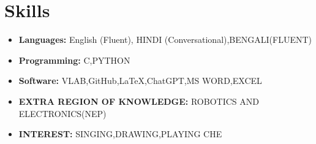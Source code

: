 \documentclass[a4paper,10pt]{article}
\begin{document}
\vspace{1cm}

\section*{Skills}
\begin{itemize}
    \item \textbf{Languages:} English (Fluent), HINDI (Conversational),BENGALI(FLUENT)
    \item \textbf{Programming:} C,PYTHON
    \item \textbf{Software:} VLAB,GitHub,LaTeX,ChatGPT,MS WORD,EXCEL
    \item \textbf{EXTRA REGION OF KNOWLEDGE:} ROBOTICS AND ELECTRONICS(NEP)
     \item \textbf{INTEREST:} SINGING,DRAWING,PLAYING CHE
\end{itemize}
\end{document}
